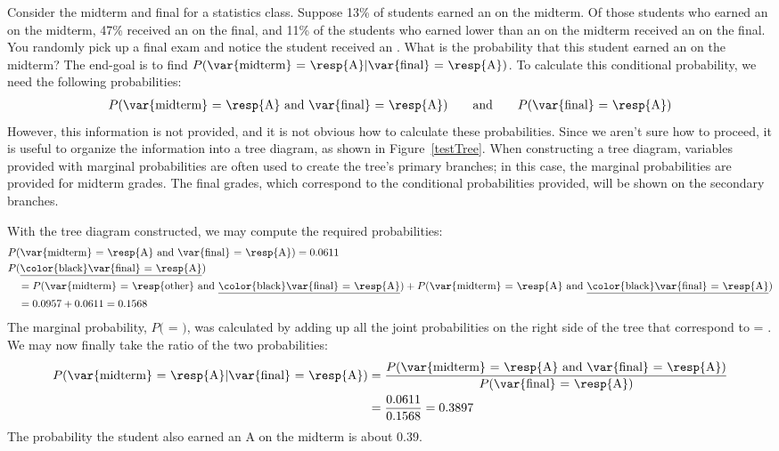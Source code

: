 \begin{examplewrap}
\begin{nexample}{Consider the midterm and final for a statistics class. Suppose 13\% of students earned an  on the midterm. Of those students who earned an  on the midterm, 47\% received an  on the final, and 11\% of the students who earned lower than an  on the midterm received an  on the final. You randomly pick up a final exam and notice the student received an . What is the probability that this student earned an  on the midterm?} \label{exerciseForTreeDiagramOfStudentGettingAOnMidtermGivenThatSheGotAOnFinal}
The end-goal is to find $P(\text{\var{midterm} = \resp{A}} | \text{\var{final} = \resp{A}})$. To calculate this conditional probability, we need the following probabilities:
\begin{align*}
P(\text{\var{midterm} = \resp{A} and \var{final} = \resp{A}})
  \qquad\text{and}\qquad
  P(\text{\var{final} = \resp{A}})
\end{align*}
However, this information is not provided, and it is not obvious how to calculate these probabilities. Since we aren't sure how to proceed, it is useful to organize the information into a tree diagram, as shown in Figure~\ref{testTree}. When constructing a tree diagram, variables provided with marginal probabilities are often used to create the tree's primary branches; in this case, the marginal probabilities are provided for midterm grades. The final grades, which correspond to the conditional probabilities provided, will be shown on the secondary branches.

With the tree diagram constructed, we may compute the required probabilities:
\begin{align*}
&P(\text{\var{midterm} = \resp{A} and \var{final} = \resp{A}}) = 0.0611 \\
&P(\text{\underline{\color{black}\var{final} = \resp{A}}})  \\
& \quad= P(\text{\var{midterm} = \resp{other} and \underline{\color{black}\var{final} = \resp{A}}}) + P(\text{\var{midterm} = \resp{A} and \underline{\color{black}\var{final} = \resp{A}}}) \\
& \quad= 0.0957 + 0.0611  = 0.1568
\end{align*}
The marginal probability, $P($ = $)$, was calculated by adding up all the joint probabilities on the right side of the tree that correspond to  = . We may now finally take the ratio of the two probabilities:
\begin{align*}
P(\text{\var{midterm} = \resp{A}} | \text{\var{final} = \resp{A}})
  &= \frac{P(\text{\var{midterm} = \resp{A}
      and \var{final} = \resp{A}})}
    {P(\text{\var{final} = \resp{A}})} \\
  &= \frac{0.0611}{0.1568} = 0.3897
\end{align*}
The probability the student also earned an A on the midterm is about 0.39.
\end{nexample}
\end{examplewrap}

